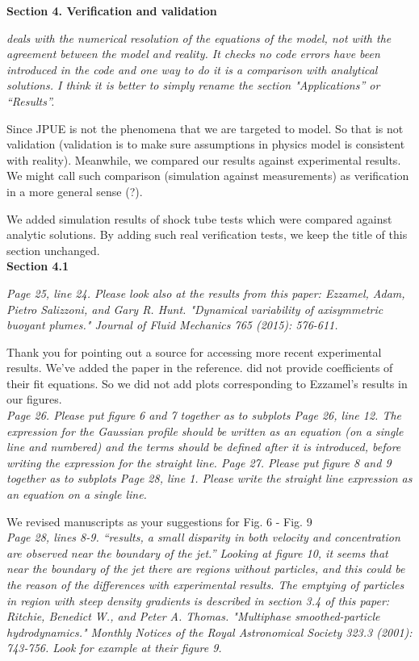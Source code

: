 \documentclass[10pt,a4paper]{article}
\begin{document}
\textbf{Section 4. Verification and validation}

\textit{deals with the numerical resolution of the equations of the model, not with the agreement between the model and reality. It checks no code errors have been introduced
in the code and one way to do it is a comparison with analytical solutions. I think it is better to simply rename the section "Applications” or “Results”.}

Since JPUE is not the phenomena that we are targeted to model. So that is not validation (validation is to make sure assumptions in physics model is consistent with reality). Meanwhile, we compared our results against experimental results. We might call such comparison (simulation against measurements) as verification in a more general sense (?). 

We added simulation results of shock tube tests which were compared against analytic solutions. By adding such real verification tests, we keep the title of this section unchanged.
\\[6pt]

\textbf{Section 4.1}

\textit{Page 25, line 24. Please look also at the results from this paper: Ezzamel, Adam, Pietro Salizzoni, and Gary R. Hunt. "Dynamical variability of axisymmetric
buoyant plumes." Journal of Fluid Mechanics 765 (2015): 576-611.}

Thank you for pointing out a source for accessing more recent experimental results. We’ve added the paper in the reference. \citet{ezzamel2015dynamical} did not provide coefficients of their fit equations. So we did not add plots corresponding to  Ezzamel's results in our figures. \\[3pt]

\textit{Page 26. Please put figure 6 and 7 together as to subplots
Page 26, line 12. The expression for the Gaussian profile should be written as an equation (on a single line and numbered) and the terms should be defined after it is introduced, before writing the expression for the straight line. Page 27. Please put figure 8 and 9 together as to subplots Page 28, line 1. Please write the straight line expression as an equation on a single line.}

We revised manuscripts as your suggestions for Fig. 6 - Fig. 9 \\[3pt]

\textit{Page 28, lines 8-9. “results, a small disparity in both velocity and concentration are observed near the boundary of the jet.” Looking at figure 10, it seems that near the boundary of the jet there are regions without particles, and this could be the reason of the differences with experimental results. The emptying of particles in region with steep density gradients is described in section 3.4 of this paper: Ritchie, Benedict W., and Peter A. Thomas. "Multiphase smoothed-particle hydrodynamics."
Monthly Notices of the Royal Astronomical Society 323.3 (2001): 743-756. Look for example at their figure 9.}
\end{document}
